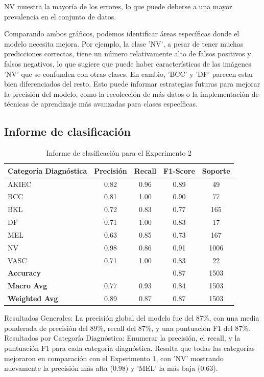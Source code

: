 NV muestra la mayoría de los errores, lo que puede deberse a una mayor prevalencia en el conjunto de datos.

Comparando ambos gráficos, podemos identificar áreas específicas donde el modelo necesita mejora. Por ejemplo, la clase 'NV', a pesar de tener muchas predicciones correctas, tiene un número relativamente alto de falsos positivos y falsos negativos, lo que sugiere que puede haber características de las imágenes 'NV' que se confunden con otras clases. En cambio, 'BCC' y 'DF' parecen estar bien diferenciados del resto. Esto puede informar estrategias futuras para mejorar la precisión del modelo, como la recolección de más datos o la implementación de técnicas de aprendizaje más avanzadas para clases específicas.

\subsection*{Informe de clasificación}

    
    \begin{table}[H]
        \centering
        \caption{Informe de clasificación para el Experimento 2}
        \label{tab:classification_report_exp2}
        \begin{tabular}{lcccc}
        \hline
        \textbf{Categoría Diagnóstica} & \textbf{Precisión} & \textbf{Recall} & \textbf{F1-Score} & \textbf{Soporte} \\
        \hline
        AKIEC & 0.82 & 0.96 & 0.89 & 49 \\
        BCC   & 0.81 & 1.00 & 0.90 & 77 \\
        BKL   & 0.72 & 0.83 & 0.77 & 165 \\
        DF    & 0.71 & 1.00 & 0.83 & 17 \\
        MEL   & 0.63 & 0.85 & 0.73 & 167 \\
        NV    & 0.98 & 0.86 & 0.91 & 1006 \\
        VASC  & 0.71 & 1.00 & 0.83 & 22 \\
        \hline
        \textbf{Accuracy} & & & 0.87 & 1503 \\
        \textbf{Macro Avg} & 0.77 & 0.93 & 0.84 & 1503 \\
        \textbf{Weighted Avg} & 0.89 & 0.87 & 0.87 & 1503 \\
        \hline
        \end{tabular}
        \end{table}
        
Resultados Generales: La precisión global del modelo fue del 87\%, con una media ponderada de precisión del 89\%, recall del 87\%, y una puntuación F1 del 87\%.
Resultados por Categoría Diagnóstica: Enumerar la precisión, el recall, y la puntuación F1 para cada categoría diagnóstica. Resalta que todas las categorías mejoraron en comparación con el Experimento 1, con 'NV' mostrando nuevamente la precisión más alta (0.98) y 'MEL' la más baja (0.63).



